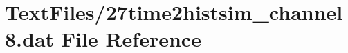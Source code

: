 \hypertarget{27time2histsim__channel8_8dat}{}\section{Text\+Files/27time2histsim\+\_\+channel8.dat File Reference}
\label{27time2histsim__channel8_8dat}
